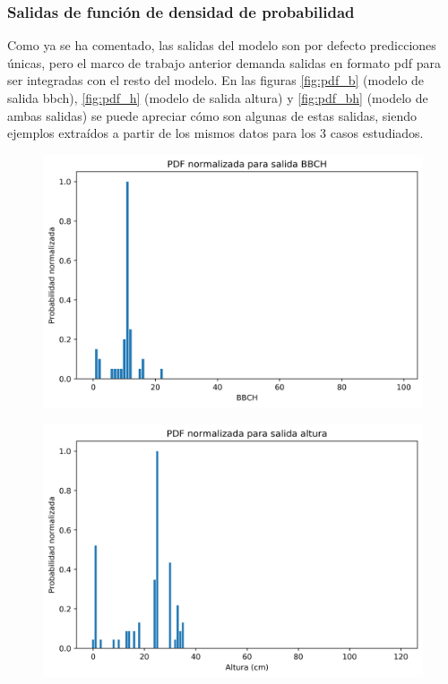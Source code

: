 \subsubsection{Salidas de función de densidad de probabilidad}
Como ya se ha comentado, las salidas del modelo son por defecto predicciones únicas, pero el marco de trabajo anterior demanda salidas en formato \gls{pdf} para ser integradas con el resto del modelo. En las figuras \ref{fig:pdf_b} (modelo de salida \gls{bbch}), \ref{fig:pdf_h} (modelo de salida altura) y \ref{fig:pdf_bh} (modelo de ambas salidas) se puede apreciar cómo son algunas de estas salidas, siendo ejemplos extraídos a partir de los mismos datos para los 3 casos estudiados. 
\\
\begin{figure}[h]
\centering
\includegraphics[width=0.85\linewidth]{archivos/tfg/Mean/TEST_PARC_PDF}
\end{figure}
\begin{figure}[h]
\centering
\includegraphics[width=0.85\linewidth]{archivos/tfg/Mean/TEST_PARC_PDF_H}
\end{figure}

